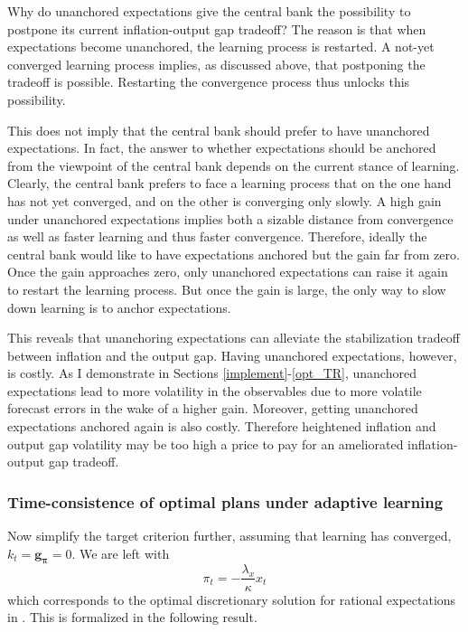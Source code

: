 \documentclass[11pt]{article}
\renewcommand{\[}{\begin{equation}}
\renewcommand{\]}{\end{equation}}
\begin{document}
Why do unanchored expectations give the central bank the possibility to postpone its current inflation-output gap tradeoff? The reason is that when expectations become unanchored, the learning process is restarted. A not-yet converged learning process implies, as discussed above, that postponing the tradeoff is possible. Restarting the convergence process thus unlocks this possibility. 

This does not imply that the central bank should prefer to have unanchored expectations. In fact, the answer to whether expectations should be anchored from the viewpoint of the central bank depends on the current stance of learning.   Clearly, the central bank prefers to face a learning process that on the one hand has not yet converged, and on the other is converging only slowly. A high gain under unanchored expectations implies both a sizable distance from convergence as well as faster learning and thus faster convergence. Therefore, ideally the central bank would like to have expectations anchored but the gain far from zero. Once the gain approaches zero, only unanchored expectations can raise it again to restart the learning process. But once the gain is large, the only way to slow down learning is to anchor expectations.

This reveals that unanchoring expectations can alleviate the stabilization tradeoff between inflation and the output gap. Having unanchored expectations, however, is costly. As I demonstrate in Sections \ref{implement}-\ref{opt_TR}, unanchored expectations lead to more volatility in the observables due to more volatile forecast errors in the wake of a higher gain. Moreover, getting unanchored expectations anchored again is also costly. Therefore heightened inflation and output gap volatility may be too high a price to pay for an ameliorated inflation-output gap tradeoff.

\subsubsection{Time-consistence of optimal plans under adaptive learning}
Now simplify the target criterion further, assuming that learning has converged, $k_t = \mathbf{g_\pi} = 0$. We are left with 
\begin{equation}
\pi_t  = -\frac{\lambda_x}{\kappa}x_t \label{cgg_discretion}
\end{equation}
which corresponds to the optimal discretionary solution for rational expectations in \cite{clarida1999science}. This is formalized in the following result.
\end{document}
